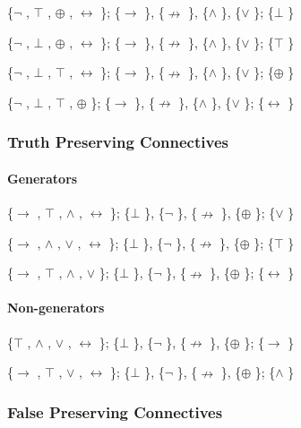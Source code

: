 \{$\neg$ , $\top$ , $\oplus$ , $\leftrightarrow$ \}; \{$\to$ \}, \{$\nrightarrow$ \}, \{$\land$ \}, \{$\lor$ \}; \{$\bot$ \}

\{$\neg$ , $\bot$ , $\oplus$ , $\leftrightarrow$ \}; \{$\to$ \}, \{$\nrightarrow$ \}, \{$\land$ \}, \{$\lor$ \}; \{$\top$ \}

\{$\neg$ , $\bot$ , $\top$ , $\leftrightarrow$ \}; \{$\to$ \}, \{$\nrightarrow$ \}, \{$\land$ \}, \{$\lor$ \}; \{$\oplus$ \}

\{$\neg$ , $\bot$ , $\top$ , $\oplus$ \}; \{$\to$ \}, \{$\nrightarrow$ \}, \{$\land$ \}, \{$\lor$ \}; \{$\leftrightarrow$ \}

\hypertarget{truth-preserving-connectives-1}{%
\subsubsection{Truth Preserving
Connectives}\label{truth-preserving-connectives-1}}

\hypertarget{generators-3}{%
\paragraph{Generators}\label{generators-3}}

\{$\to$ , $\top$ , $\land$ , $\leftrightarrow$ \}; \{$\bot$ \}, \{$\neg$ \}, \{$\nrightarrow$ \}, \{$\oplus$ \}; \{$\lor$ \}

\{$\to$ , $\land$ , $\lor$ , $\leftrightarrow$ \}; \{$\bot$ \}, \{$\neg$ \}, \{$\nrightarrow$ \}, \{$\oplus$ \}; \{$\top$ \}

\{$\to$ , $\top$ , $\land$ , $\lor$ \}; \{$\bot$ \}, \{$\neg$ \}, \{$\nrightarrow$ \}, \{$\oplus$ \}; \{$\leftrightarrow$ \}

\hypertarget{non-generators-3}{%
\paragraph{Non-generators}\label{non-generators-3}}

\{$\top$ , $\land$ , $\lor$ , $\leftrightarrow$ \}; \{$\bot$ \}, \{$\neg$ \}, \{$\nrightarrow$ \}, \{$\oplus$ \}; \{$\to$ \}

\{$\to$ , $\top$ , $\lor$ , $\leftrightarrow$ \}; \{$\bot$ \}, \{$\neg$ \}, \{$\nrightarrow$ \}, \{$\oplus$ \}; \{$\land$ \}

\hypertarget{false-preserving-connectives-1}{%
\subsubsection{False Preserving
Connectives}\label{false-preserving-connectives-1}}

